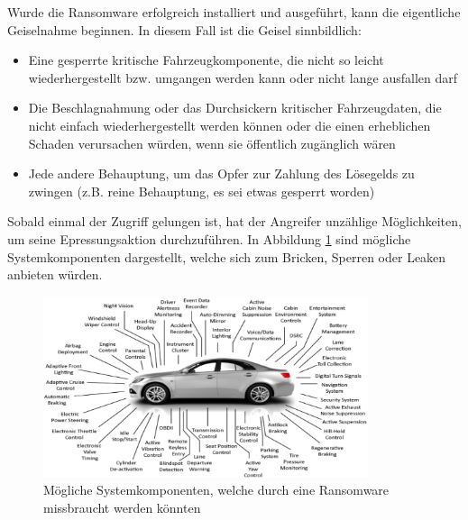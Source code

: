 Wurde die Ransomware erfolgreich installiert und ausgeführt, kann die 
eigentliche Geiselnahme beginnen. In diesem Fall ist die Geisel sinnbildlich:

\begin{itemize}
    \item Eine gesperrte kritische Fahrzeugkomponente, die nicht so leicht
    wiederhergestellt bzw. umgangen werden kann oder nicht lange ausfallen darf
    \item Die Beschlagnahmung oder das Durchsickern kritischer Fahrzeugdaten, die nicht 
    einfach wiederhergestellt werden können oder die einen erheblichen Schaden 
    verursachen würden, wenn sie öffentlich zugänglich wären
    \item Jede andere Behauptung, um das Opfer zur Zahlung des Lösegelds zu zwingen 
    (z.B. reine Behauptung, es sei etwas gesperrt worden)
\end{itemize}

Sobald einmal der Zugriff gelungen ist, hat der Angreifer unzählige 
Möglichkeiten, um seine Epressungsaktion durchzuführen. In Abbildung \ref{fig:Erpressung} sind 
mögliche Systemkomponenten dargestellt, welche sich zum Bricken, Sperren oder 
Leaken anbieten würden.
\newline

\begin{figure}[htbp!]
    \centering
    \includegraphics[width=0.85\textwidth]{Images/Diagnostic-Scanning-1.jpg}
    \caption{Mögliche Systemkomponenten, welche durch eine Ransomware missbraucht werden könnten
    \cite{SnapEDABlog.2014}}
    \label{fig:Erpressung}
\end{figure}

